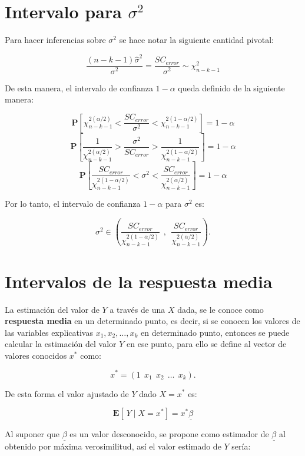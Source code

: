 \documentclass[
  a4paper,
  oneside,
  openany]{book}
\begin{document}
\hypertarget{intervalo-para-sigma2-1}{%
\section{\texorpdfstring{Intervalo para \(\sigma^2\)}{Intervalo para \textbackslash sigma\^{}2}}\label{intervalo-para-sigma2-1}}

Para hacer inferencias sobre \(\sigma^2\) se hace notar la siguiente cantidad pivotal:

\[\frac{(n-k-1)\hat{\sigma}^2}{\sigma^2}=\frac{SC_{error}}{\sigma^2} \sim \chi^2_{n-k-1}\]

De esta manera, el intervalo de confianza \(1-\alpha\) queda definido de la siguiente manera:

\[\mathbf{P}\left[ \chi^{2(\alpha/2)}_{n-k-1}<\frac{SC_{error}}{\sigma^2}<\chi^{2(1-\alpha/2)}_{n-k-1}\right]=1-\alpha\]
\[\mathbf{P}\left[ \frac{1}{\chi^{2(\alpha/2)}_{n-k-1}}>\frac{\sigma^2}{SC_{error}}>\frac{1}{\chi^{2(1-\alpha/2)}_{n-k-1}}\right]=1-\alpha\]
\[\mathbf{P}\left[ \frac{SC_{error}}{\chi^{2(1-\alpha/2)}_{n-k-1}}<\sigma^2<\frac{SC_{error}}{\chi^{2(\alpha/2)}_{n-k-1}}\right]=1-\alpha\]

Por lo tanto, el intervalo de confianza \(1-\alpha\) para \(\sigma^2\) es:

\[\sigma^2 \in \left(\frac{SC_{error}}{\chi^{2(1-\alpha/2)}_{n-k-1}}\ \ , \ \ \frac{SC_{error}}{\chi^{2(\alpha/2)}_{n-k-1}}\right).\]

\hypertarget{intervalos-de-la-respuesta-media}{%
\section{Intervalos de la respuesta media}\label{intervalos-de-la-respuesta-media}}

La estimación del valor de \(Y\) a través de una \(X\) dada, se le conoce como \textbf{respuesta media} en un determinado punto, es decir, si se conocen los valores de las variables explicativas \(x_{1},x_{2}, \ldots , x_{k}\) en determinado punto, entonces se puede calcular la estimación del valor \(Y\) en ese punto, para ello se define al vector de valores conocidos \(x^*\) como:

\[x^*= \left( 1 \ \ x_{1} \ \ x_{2} \ \ \ldots \ \ x_{k}\right).\]

De esta forma el valor ajustado de \(Y\) dado \(X=x^*\) es:

\[\mathbf{E}[ \ Y \mid X=x^*]=x^*\underline{\beta}\]

Al suponer que \(\underline{\beta}\) es un valor desconocido, se propone como estimador de \(\underline{\beta}\) al obtenido por máxima verosimilitud, así el valor estimado de \(Y\) sería:
\end{document}
